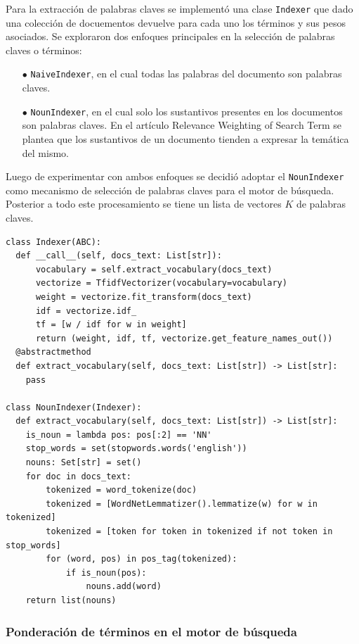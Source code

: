 Para la extracción de palabras claves se implementó una clase \verb|Indexer| que dado una colección de docuementos devuelve para cada uno los términos y sus pesos asociados. Se exploraron dos enfoques principales en la selección de palabras claves o términos:

\begin{enumerate}
    \item[$\bullet$] \verb|NaiveIndexer|, en el cual todas las palabras del documento son palabras claves.
    \item[$\bullet$] \verb|NounIndexer|, en el cual solo los sustantivos presentes en los documentos son palabras claves. En el artículo Relevance Weighting of Search Term \cite{re} se plantea que los sustantivos de un documento tienden a expresar la temática del mismo. 
\end{enumerate}

Luego de experimentar con ambos enfoques se decidió adoptar el \verb|NounIndexer| como mecanismo de selección de palabras claves para el motor de búsqueda. Posterior a todo este procesamiento se tiene un lista de vectores $K$ de palabras claves.

\begin{verbatim}
class Indexer(ABC):
  def __call__(self, docs_text: List[str]):
      vocabulary = self.extract_vocabulary(docs_text)
      vectorize = TfidfVectorizer(vocabulary=vocabulary)
      weight = vectorize.fit_transform(docs_text)
      idf = vectorize.idf_
      tf = [w / idf for w in weight]
      return (weight, idf, tf, vectorize.get_feature_names_out())
  @abstractmethod
  def extract_vocabulary(self, docs_text: List[str]) -> List[str]:
    pass

class NounIndexer(Indexer):
  def extract_vocabulary(self, docs_text: List[str]) -> List[str]:
    is_noun = lambda pos: pos[:2] == 'NN'
    stop_words = set(stopwords.words('english'))
    nouns: Set[str] = set()
    for doc in docs_text:
        tokenized = word_tokenize(doc)
        tokenized = [WordNetLemmatizer().lemmatize(w) for w in tokenized]
        tokenized = [token for token in tokenized if not token in stop_words]
        for (word, pos) in pos_tag(tokenized):
            if is_noun(pos):
                nouns.add(word)
    return list(nouns)
\end{verbatim}

\subsubsection{Ponderación de términos en el motor de búsqueda}

